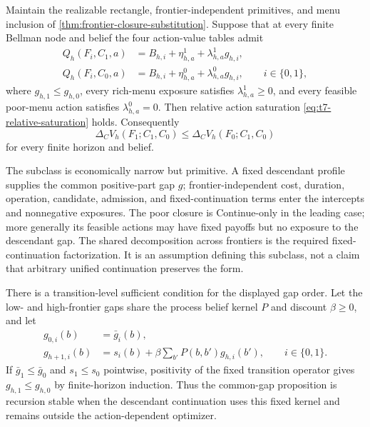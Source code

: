 \begin{proposition}
\label{prop:primitive-frontier-saturation}
Maintain the realizable rectangle, frontier-independent primitives, and menu
inclusion of \cref{thm:frontier-closure-substitution}.  Suppose that at every
finite Bellman node and belief the four action-value tables admit
\begin{equation}\label{eq:primitive-common-gap}
\begin{aligned}
 Q_h(F_i,C_1,a)
   &=B_{h,i}+\eta^1_{h,a}+\lambda^1_{h,a}g_{h,i},\\
 Q_h(F_i,C_0,a)
   &=B_{h,i}+\eta^0_{h,a}+\lambda^0_{h,a}g_{h,i},
 \qquad i\in\{0,1\},
\end{aligned}
\end{equation}
where \(g_{h,1}\le g_{h,0}\), every rich-menu exposure satisfies
\(\lambda^1_{h,a}\ge0\), and every feasible poor-menu action satisfies
\(\lambda^0_{h,a}=0\).  Then relative action saturation
\eqref{eq:t7-relative-saturation} holds.  Consequently
\[
 \Delta_CV_h(F_1;C_1,C_0)
 \le
 \Delta_CV_h(F_0;C_1,C_0)
\]
for every finite horizon and belief.
\end{proposition}

The subclass is economically narrow but primitive.  A fixed descendant
profile supplies the common positive-part gap \(g\); frontier-independent
cost, duration, operation, candidate, admission, and fixed-continuation terms
enter the intercepts and nonnegative exposures.  The poor closure is
Continue-only in the leading case; more generally its feasible actions may
have fixed payoffs but no exposure to the descendant gap.  The shared
decomposition across frontiers is the required fixed-continuation
factorization.  It is an assumption defining this subclass, not a claim that
arbitrary unified continuation preserves the form.

There is a transition-level sufficient condition for the displayed gap order.
Let the low- and high-frontier gaps share the process belief kernel \(P\) and
discount \(\beta\ge0\), and let
\[
\begin{aligned}
 g_{0,i}(b)&=\bar g_i(b),\\
 g_{h+1,i}(b)
   &=s_i(b)+\beta\sum_{b'}P(b,b')g_{h,i}(b'),
 \qquad i\in\{0,1\}.
\end{aligned}
\]
If \(\bar g_1\le\bar g_0\) and \(s_1\le s_0\) pointwise, positivity of the
fixed transition operator gives \(g_{h,1}\le g_{h,0}\) by finite-horizon
induction.  Thus the common-gap proposition is recursion stable when the
descendant continuation uses this fixed kernel and remains outside the
action-dependent optimizer.

